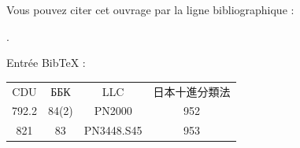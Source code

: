 \documentclass[a4paper,12pt,twoside,french]{book}
\begin{document}
\begin{center}
      Vous pouvez citer cet ouvrage par la ligne bibliographique :

      .

      \vspace{1em}

      \makeatletter
      \preto{\@verbatim}{\topsep=0pt \partopsep=0pt }
      \makeatother
      \noindent{}Entrée Bib\TeX{} :

      \newlength{\bibentrywidth}%
      \settowidth{\bibentrywidth}{\texttt{}} %
%
	  \vspace{-1em}
      \begin{minipage}{\bibentrywidth}
	  \vspace{-1em}
      \unskip\texttt{}
      \end{minipage}

    \begin{tabular}{ c c c c }
    CDU   & ББК   &  LLC &  日本十進分類法 \\
    792.2 & 84(2) &  PN2000 & 952 \\
    821   & 83    &  PN3448.S45 & 953
    \end{tabular}




    \vfill
    \null





    \end{center}
    \restoregeometry



  \null
  \thispagestyle{empty}

  \null\vfill

\end{document}
